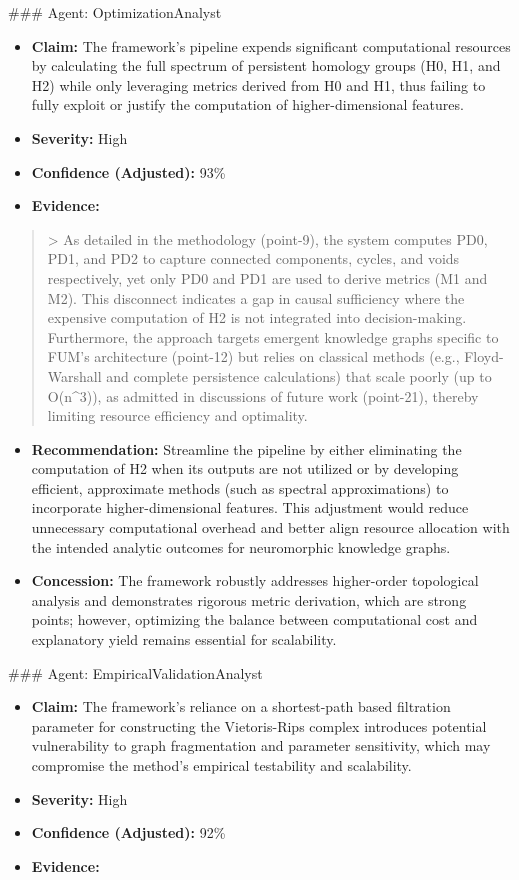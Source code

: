 \documentclass[12pt]{article}
\begin{document}
\hrulefill
\#\#\# Agent: OptimizationAnalyst
\begin{itemize}
  \item \textbf{Claim:} The framework’s pipeline expends significant computational resources by calculating the full spectrum of persistent homology groups (H0, H1, and H2) while only leveraging metrics derived from H0 and H1, thus failing to fully exploit or justify the computation of higher-dimensional features.
  \item \textbf{Severity:} High
  \item \textbf{Confidence (Adjusted):} 93\%
  \item \textbf{Evidence:}
\end{itemize}
\begin{quote}
> As detailed in the methodology (point-9), the system computes PD0, PD1, and PD2 to capture connected components, cycles, and voids respectively, yet only PD0 and PD1 are used to derive metrics (M1 and M2). This disconnect indicates a gap in causal sufficiency where the expensive computation of H2 is not integrated into decision-making. Furthermore, the approach targets emergent knowledge graphs specific to FUM’s architecture (point-12) but relies on classical methods (e.g., Floyd-Warshall and complete persistence calculations) that scale poorly (up to O(n\^{}3)), as admitted in discussions of future work (point-21), thereby limiting resource efficiency and optimality.
\end{quote}
\begin{itemize}
  \item \textbf{Recommendation:} Streamline the pipeline by either eliminating the computation of H2 when its outputs are not utilized or by developing efficient, approximate methods (such as spectral approximations) to incorporate higher-dimensional features. This adjustment would reduce unnecessary computational overhead and better align resource allocation with the intended analytic outcomes for neuromorphic knowledge graphs.
  \item \textbf{Concession:} The framework robustly addresses higher-order topological analysis and demonstrates rigorous metric derivation, which are strong points; however, optimizing the balance between computational cost and explanatory yield remains essential for scalability.
\end{itemize}
\hrulefill
\#\#\# Agent: EmpiricalValidationAnalyst
\begin{itemize}
  \item \textbf{Claim:} The framework's reliance on a shortest-path based filtration parameter for constructing the Vietoris-Rips complex introduces potential vulnerability to graph fragmentation and parameter sensitivity, which may compromise the method’s empirical testability and scalability.
  \item \textbf{Severity:} High
  \item \textbf{Confidence (Adjusted):} 92\%
  \item \textbf{Evidence:}
\end{itemize}
\end{document}
